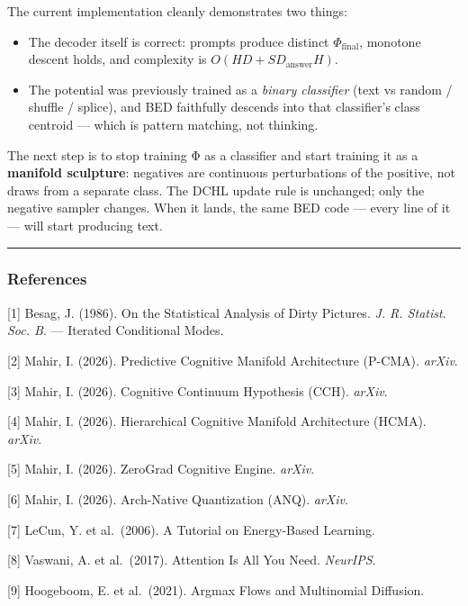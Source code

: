 \documentclass[
  11pt,
  a4paper,
]{article}
\providecommand{\tightlist}{%
  \setlength{\itemsep}{0pt}\setlength{\parskip}{0pt}}
\begin{document}
The current implementation cleanly demonstrates two things:

\begin{itemize}
\tightlist
\item
  The decoder itself is correct: prompts produce distinct
  \(\Phi_{\text{final}}\), monotone descent holds, and complexity is
  \(O(HD + SD_{\text{answer}}H)\).
\item
  The potential was previously trained as a \emph{binary classifier}
  (text vs random / shuffle / splice), and BED faithfully descends into
  that classifier's class centroid --- which is pattern matching, not
  thinking.
\end{itemize}

The next step is to stop training Φ as a classifier and start training
it as a \textbf{manifold sculpture}: negatives are continuous
perturbations of the positive, not draws from a separate class. The DCHL
update rule is unchanged; only the negative sampler changes. When it
lands, the same BED code --- every line of it --- will start producing
text.

\begin{center}\rule{0.5\linewidth}{0.5pt}\end{center}

\subsubsection{References}\label{references-1}

{[}1{]} Besag, J. (1986). On the Statistical Analysis of Dirty Pictures.
\emph{J. R. Statist. Soc. B}. --- Iterated Conditional Modes.

{[}2{]} Mahir, I. (2026). Predictive Cognitive Manifold Architecture
(P-CMA). \emph{arXiv}.

{[}3{]} Mahir, I. (2026). Cognitive Continuum Hypothesis (CCH).
\emph{arXiv}.

{[}4{]} Mahir, I. (2026). Hierarchical Cognitive Manifold Architecture
(HCMA). \emph{arXiv}.

{[}5{]} Mahir, I. (2026). ZeroGrad Cognitive Engine. \emph{arXiv}.

{[}6{]} Mahir, I. (2026). Arch-Native Quantization (ANQ). \emph{arXiv}.

{[}7{]} LeCun, Y. et al.~(2006). A Tutorial on Energy-Based Learning.

{[}8{]} Vaswani, A. et al.~(2017). Attention Is All You Need.
\emph{NeurIPS}.

{[}9{]} Hoogeboom, E. et al.~(2021). Argmax Flows and Multinomial
Diffusion.
\end{document}
